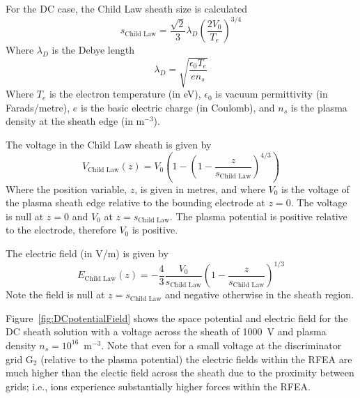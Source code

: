 For the DC case, the Child Law sheath size is calculated 
\begin{equation}
s_\text{Child Law} = \frac{\sqrt{2}}{3} \lambda_D \left( \frac{2 V_0}{T_e} \right)^{3/4}
\end{equation}
Where $\lambda_D$ is the Debye length
\begin{equation}
\lambda_D = \sqrt{ \frac{\epsilon_0 T_e}{e n_s} }
\end{equation}
Where $T_e$ is the electron temperature (in eV), $\epsilon_0$ is vacuum permittivity (in Farads/metre), $e$ is the basic electric charge (in Coulomb), and $n_s$ is the plasma density at the sheath edge (in m$^{-3}$).

The voltage in the Child Law sheath is given by
\begin{equation}
V_\text{Child Law}(z) = V_0 \left( 1 -  \left( 1 -\frac{z}{s_\text{Child Law}} \right)^{4/3} \right)
\end{equation}
Where the position variable, $z$, is given in metres, and where $V_0$ is the voltage of the plasma sheath edge relative to the bounding electrode at $z=0$. The voltage is null at $z=0$ and $V_0$ at $z=s_\text{Child Law}$. The plasma potential is positive relative to the electrode, therefore $V_0$ is positive.

The electric field (in V/m) is given by
\begin{equation}
E_\text{Child Law}(z) = -\frac{4}{3} \frac{V_0}{s_\text{Child Law}} \left( 1 - \frac{z}{s_\text{Child Law}}  \right)^{1/3}
\end{equation}
Note the field is null at $z=s_\text{Child Law}$ and negative otherwise in the sheath region. 

Figure~\ref{fig:DCpotentialField} shows the space potential and electric field for the DC sheath solution with a voltage across the sheath of 1000~V and plasma density $n_s = 10^{16}$~m$^{-3}$. Note that even for a small voltage at the discriminator grid G$_2$ (relative to the plasma potential) the electric fields within the RFEA are much higher than the electic field across the sheath due to the proximity between grids; i.e., ions experience substantially higher forces within the RFEA. 


